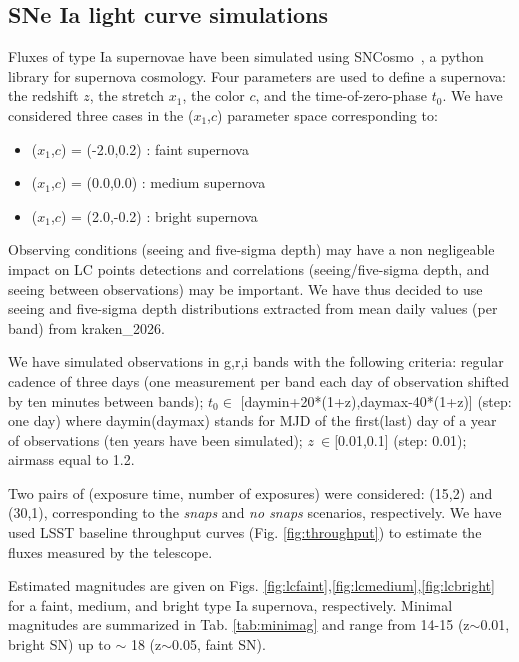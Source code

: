 \documentclass[\docopts]{\docclass}
\newcommand{\sne}{{SNe Ia }}
\newcommand{\sncosmo}{{\sc SNCosmo}}
\newcommand{\redshift}{{$z$}}
\newcommand{\snstretch}{{$x_{1}$}}
\newcommand{\sncolor}{{$c$}}
\newcommand{\daymax}{{$t_{0}$}}
\begin{document}
\subsection{\sne light curve simulations}
Fluxes of type Ia supernovae have been simulated using \sncosmo~\cite{2016ascl.soft11017B}, a python library for supernova cosmology. Four parameters are used to define a supernova: the redshift \redshift, the stretch \snstretch, the color \sncolor, and the time-of-zero-phase \daymax. We have considered three cases in the (\snstretch,\sncolor) parameter space corresponding to:
\begin{itemize}
\item (\snstretch,\sncolor) = (-2.0,0.2) : faint supernova
\item (\snstretch,\sncolor) = (0.0,0.0) : medium supernova
 \item (\snstretch,\sncolor) = (2.0,-0.2) : bright supernova
\end{itemize}
Observing conditions (seeing and five-sigma depth) may have a non negligeable impact on LC points detections and correlations (seeing/five-sigma depth, and  seeing between observations) may be important. We have thus decided to use seeing and five-sigma depth distributions extracted from mean daily values (per band) from kraken\_2026.\par
We have simulated observations in g,r,i bands with the following criteria:  regular cadence of three days (one measurement per band each day of observation shifted by ten minutes between bands); \daymax $\in$ [daymin+20*(1+z),daymax-40*(1+z)] (step: one day) where daymin(daymax)  stands for MJD of the first(last)  day of a year of observations (ten years have been simulated); $z~\in$[0.01,0.1] (step: 0.01); airmass equal to 1.2. \par
Two pairs of (exposure time, number of exposures) were considered: (15,2) and (30,1), corresponding to the {\it snaps} and {\it no snaps} scenarios, respectively. We have used LSST baseline throughput curves (Fig. \ref{fig:throughput}) to estimate the fluxes measured by the telescope.


Estimated magnitudes are given on Figs. \ref{fig:lcfaint},\ref{fig:lcmedium},\ref{fig:lcbright} for a faint, medium, and bright type Ia supernova, respectively. Minimal magnitudes are summarized in Tab. \ref{tab:minimag} and range from 14-15 (z$\sim$0.01, bright SN) up to $\sim$ 18 (z$\sim$0.05, faint SN). 
\end{document}
